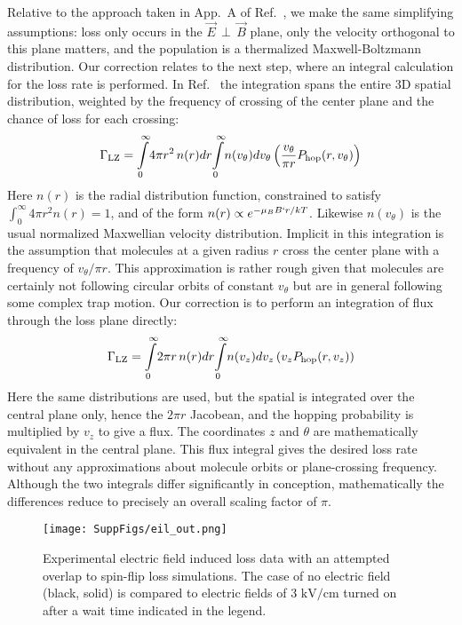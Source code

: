 \documentclass[%
 reprint,
 amsmath,amssymb,
 aps,
pra,
]{revtex4-1}
\newcommand{\epb}{{$\vec{E}\,{\perp}\,\vec{B}$}}
\begin{document}
Relative to the approach taken in App.~A of Ref.~\cite{Stuhl2013}, we make the same simplifying assumptions: loss only occurs in the \epb{} plane, only the velocity orthogonal to this plane matters, and the population is a thermalized Maxwell-Boltzmann distribution.
Our correction relates to the next step, where an integral calculation for the loss rate is performed.
In Ref.~\cite{Stuhl2013} the integration spans the entire 3D spatial distribution, weighted by the frequency of crossing of the center plane and the chance of loss for each crossing:
\begin{equation}
\Gamma_\text{LZ}=\int\displaylimits_0^\infty\!4\pi r^2\,n(r)dr\!\int\displaylimits_0^\infty \!n(v_\theta)dv_\theta\left( \frac{v_\theta}{\pi r} P_\text{hop}(r,v_\theta)\right)
\end{equation}
Here $n(r)$ is the radial distribution function, constrained to satisfy $\int_0^\infty 4\pi r^2n(r)=1$, and of the form $n(r)\propto e^{-\mu_BB`r/kT}$. 
Likewise $n(v_\theta)$ is the usual normalized Maxwellian velocity distribution. 
Implicit in this integration is the assumption that molecules at a given radius $r$ cross the center plane with a frequency of $v_\theta/\pi r$.
This approximation is rather rough given that molecules are certainly not following circular orbits of constant $v_\theta$ but are in general following some complex trap motion.
Our correction is to perform an integration of flux through the loss plane directly:
\begin{equation}
\Gamma_\text{LZ}=\int\displaylimits_0^\infty\!2\pi r \,n(r)dr\!\int\displaylimits_0^\infty\! n(v_z)dv_z\left(v_z P_\text{hop}(r,v_z)\right)
\end{equation}
Here the same distributions are used, but the spatial is integrated over the central plane only, hence the $2\pi r$ Jacobean, and the hopping probability is multiplied by $v_z$ to give a flux.
The coordinates $z$ and $\theta$ are mathematically equivalent in the central plane.
This flux integral gives the desired loss rate without any approximations about molecule orbits or plane-crossing frequency.
Although the two integrals differ significantly in conception, mathematically the differences reduce to precisely an overall scaling factor of $\pi$.

\begin{figure}[t] 
\texttt{[image: SuppFigs/eil\_out.png]} 
\caption{Experimental electric field induced loss data with an attempted overlap to spin-flip loss simulations. The case of no electric field (black, solid) is compared to electric fields of $3\text{ kV/cm}$ turned on after a wait time indicated in the legend.
\label{fig:eil}}
\end{figure}
\end{document}
